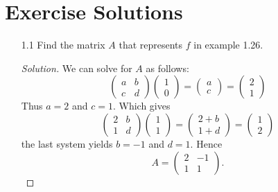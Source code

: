 \documentclass[12pt]{article}
\theoremstyle{definition}
\theoremstyle{definition}
\newenvironment{solution}
  {\renewcommand\qedsymbol{$\blacksquare$}\begin{proof}[Solution]}
  {\end{proof}}
\begin{document}
\section{Exercise Solutions}
    \begin{enumerate}
        \item[1.1] Find the matrix $A$ that represents $f$ in example 1.26.
            \begin{solution}
                We can solve for $A$ as follows:
                \begin{equation*}
                    \begin{pmatrix} a & b \\
                    c & d\end{pmatrix}\begin{pmatrix}1 \\
                    0\end{pmatrix} = \begin{pmatrix} a \\
                    c\end{pmatrix}=\begin{pmatrix}2 \\
                    1\end{pmatrix}
                \end{equation*}
                Thus $a=2$ and $c=1$. Which gives 
                \begin{equation*}
                    \begin{pmatrix} 2 & b \\
                    1 & d\end{pmatrix}\begin{pmatrix} 1 \\
                    1\end{pmatrix}=\begin{pmatrix} 2+b \\
                    1+d\end{pmatrix}=\begin{pmatrix}1 \\
                    2\end{pmatrix}
                \end{equation*}
                the last system yields $b=-1$ and $d=1$. Hence
                \begin{equation*}
                    A=\begin{pmatrix}2 & -1\\
                    1 & 1\end{pmatrix}.

\end{equation*}
\end{solution}
\end{enumerate}
\end{document}
